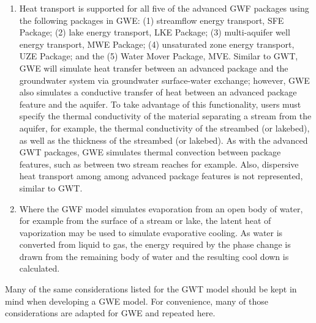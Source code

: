 \begin{enumerate}
\item Heat transport is supported for all five of the advanced GWF packages using the following packages in GWE: (1) streamflow energy transport, SFE Package; (2) lake energy transport, LKE Package; (3) multi-aquifer well energy transport, MWE Package; (4) unsaturated zone energy transport, UZE Package; and the (5) Water Mover Package, MVE.  Similar to GWT, GWE will simulate heat transfer between an advanced package and the groundwater system via groundwater surface-water exchange; however, GWE also simulates a conductive transfer of heat between an advanced package feature and the aquifer.  To take advantage of this functionality, users must specify the thermal conductivity of the material separating a stream from the aquifer, for example, the thermal conductivity of the streambed (or lakebed), as well as the thickness of the streambed (or lakebed).  As with the advanced GWT packages, GWE simulates thermal convection between package features, such as between two stream reaches for example.  Also, dispersive heat transport among among advanced package features is not represented, similar to GWT.

\item Where the GWF model simulates evaporation from an open body of water, for example from the surface of a stream or lake, the latent heat of vaporization may be used to simulate evaporative cooling.  As water is converted from liquid to gas, the energy required by the phase change is drawn from the remaining body of water and the resulting cool down is calculated.

\end{enumerate}

Many of the same considerations listed for the GWT model should be kept in mind when developing a GWE model. For convenience, many of those considerations are adapted for GWE and repeated here.

